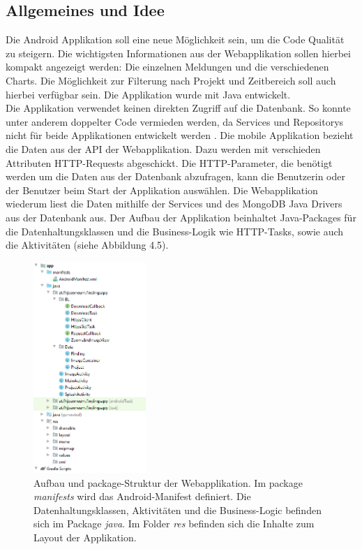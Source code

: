 \subsection{Allgemeines und Idee}
Die Android Applikation soll eine neue Möglichkeit sein, um die Code Qualität zu steigern. Die wichtigsten Informationen aus der Webapplikation sollen hierbei kompakt angezeigt werden: Die einzelnen Meldungen und die verschiedenen Charts. Die Möglichkeit zur Filterung nach Projekt und Zeitbereich soll auch hierbei verfügbar sein. Die Applikation wurde mit Java entwickelt. \\ Die Applikation verwendet keinen direkten Zugriff auf die Datenbank. So konnte unter anderem doppelter Code vermieden werden, da Services und Repositorys nicht für beide Applikationen entwickelt werden . Die mobile Applikation bezieht die Daten aus der API der Webapplikation. Dazu werden mit verschieden Attributen HTTP-Requests abgeschickt. Die HTTP-Parameter, die benötigt werden um die Daten aus der Datenbank abzufragen, kann die Benutzerin oder der Benutzer beim Start der Applikation auswählen. Die Webapplikation wiederum liest die Daten mithilfe der Services und des MongoDB Java Drivers aus der Datenbank aus. Der Aufbau der Applikation beinhaltet Java-Packages für die Datenhaltungsklassen und die Business-Logik wie HTTP-Tasks, sowie auch die Aktivitäten (siehe Abbildung 4.5).

\begin{figure}[tp]
  \centering
  \includegraphics[height=8cm]{images/androidPackages.PNG}
 \caption[Aufbau und Package-Struktur der Webapplikation]{Aufbau und package-Struktur der Webapplikation. Im package \textit{manifests} wird das Android-Manifest definiert. Die Datenhaltungsklassen, Aktivitäten und die Business-Logic befinden sich im Package \textit{java}. Im Folder \textit{res} befinden sich die Inhalte zum Layout der Applikation.}
  \label{fig:popup}
\end{figure}


